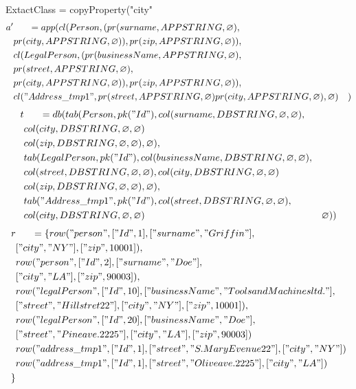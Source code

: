 \documentclass[11pt]{article}
\begin{document}
\newpage
ExtactClass = copyProperty("city"
\begin{align*}
a' & \;\;\;\;\;\; =app(cl(Person, (pr(surname, APPSTRING, \varnothing), \\
& pr(city, APPSTRING, \varnothing)), pr(zip, APPSTRING, \varnothing)), \\
& cl(LegalPerson, (pr(businessName, APPSTRING, \varnothing), \\
& pr(street, APPSTRING, \varnothing), \\
& pr(city, APPSTRING, \varnothing)), pr(zip, APPSTRING, \varnothing)), \\
& cl("Address\_tmp1", pr(street, APPSTRING, \varnothing) pr(city, APPSTRING, \varnothing) , \varnothing)
& )
\end{align*}
\begin{align*}
t & \;\;\;\;\;\; =db(tab(Person, pk("Id"), col(surname, DBSTRING, \varnothing, \varnothing), \\
& col(city, DBSTRING, \varnothing, \varnothing) \\
& col(zip, DBSTRING, \varnothing, \varnothing), \varnothing), \\
& tab(LegalPerson, pk("Id"),  col(businessName, DBSTRING, \varnothing, \varnothing), \\
& col(street, DBSTRING, \varnothing, \varnothing), col(city, DBSTRING, \varnothing, \varnothing) \\
& col(zip, DBSTRING, \varnothing, \varnothing), \varnothing), \\
& tab("Address\_tmp1", pk("Id"), col(street, DBSTRING, \varnothing, \varnothing),\\
& col(city, DBSTRING, \varnothing, \varnothing)
& \varnothing)) 
\end{align*}
\begin{align*}
r & \;\;\;\;\;\; =\{ row("person", ["Id", 1], ["surname", "Griffin"], \\
& ["city", "NY"], ["zip", 10001]), \\
& row("person", ["Id", 2], ["surname", "Doe"], \\
&  ["city", "LA"], ["zip", 90003]), \\
& row("legalPerson", ["Id", 10], ["businessName", "Tools and Machines ltd."], \\
& ["street", "Hill stret 22"], ["city", "NY"], ["zip", 10001]), \\
& row("legalPerson", ["Id", 20], ["businessName", "Doe"], \\
& ["street", "Pine ave. 2225"], ["city", "LA"], ["zip", 90003])\\
& row("address\_tmp1", ["Id", 1], ["street", "S. Mary Evenue 22"], ["city", "NY"]) \\
& row("address\_tmp1", ["Id", 1], ["street", "Olive ave. 2225"], ["city", "LA"] )\\
\}
\end{align*}
\end{document}
